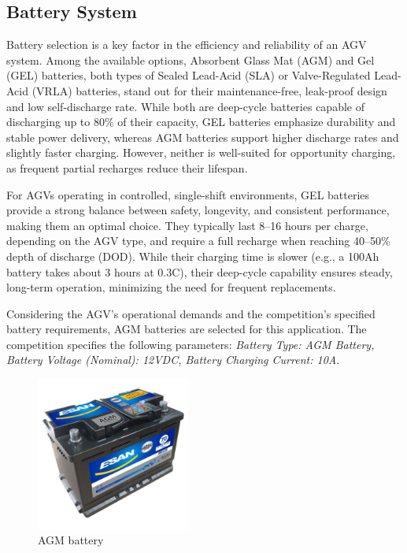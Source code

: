 \documentclass[../../main]{subfiles}
\begin{document}
\subsection{Battery System}

Battery selection is a key factor in the efficiency and reliability of an AGV system. 
Among the available options, Absorbent Glass Mat (AGM) and Gel (GEL) batteries, 
both types of Sealed Lead-Acid (SLA) or Valve-Regulated Lead-Acid (VRLA) batteries, 
stand out for their maintenance-free, leak-proof design and low self-discharge rate. 
While both are deep-cycle batteries capable of discharging up to 80\% of their capacity, 
GEL batteries emphasize durability and stable power delivery, whereas AGM batteries 
support higher discharge rates and slightly faster charging. 
However, neither is well-suited for opportunity charging, as frequent partial recharges reduce their lifespan.

For AGVs operating in controlled, single-shift environments, 
GEL batteries provide a strong balance between safety, longevity, and consistent performance, 
making them an optimal choice. They typically last 8--16 hours per charge, depending on the AGV type, 
and require a full recharge when reaching 40--50\% depth of discharge (DOD). 
While their charging time is slower (e.g., a 100Ah battery takes about 3 hours at 0.3C), 
their deep-cycle capability ensures steady, long-term operation, minimizing the need for frequent replacements.

Considering the AGV’s operational demands and the competition's specified battery requirements, 
AGM batteries are selected for this application. The competition specifies the following parameters: 
\textit{Battery Type: AGM Battery, Battery Voltage (Nominal): 12VDC, Battery Charging Current: 10A}.

\begin{figure}[H]
    \centering
\includegraphics[width=0.45\textwidth]{fig/battery.jpg}
\caption{AGM battery}
\label{AGM battery} %
\end{figure}
\end{document}
